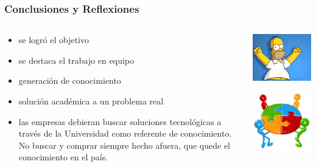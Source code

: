 \documentclass{beamer}
\begin{document}
\begin{frame}
	\frametitle{Conclusiones y Reflexiones}
	
	\begin{columns}	
		\begin{column}{9cm}
			\begin{itemize}
				\item se logró el objetivo %

				\bigskip
				\item se destaca el trabajo en equipo

				\bigskip
				\item generación de conocimiento

				\bigskip
				\item solución académica a un problema real

				\bigskip
				\item las empresas debieran buscar soluciones tecnológicas a través de la Universidad como referente de conocimiento. No buscar y comprar siempre hecho afuera, que quede el conocimiento en el país.
			\end{itemize}		
		\end{column}
		
		\begin{column}{2cm}
			\begin{center}
				\includegraphics[scale=.2]{Imagenes/sinomas.jpg}

				\bigskip
				\includegraphics[scale=.2]{Imagenes/EQUIPO.jpg} %



\end{center}
\end{column}
\end{columns}
\end{frame}
\end{document}
